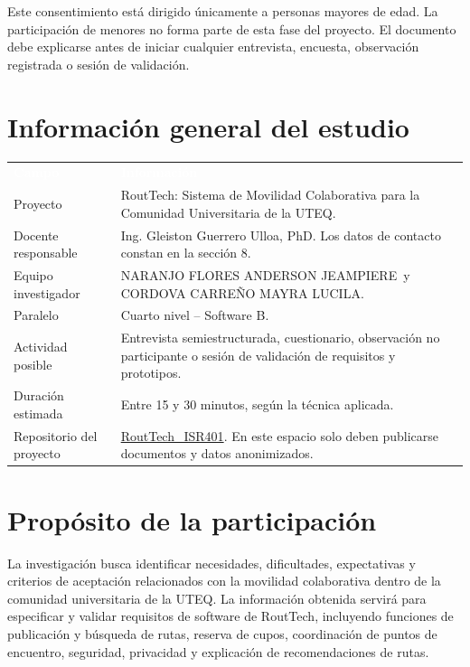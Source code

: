 \documentclass[10pt,a4paper]{article}
\newcommand{\Proyecto}{RoutTech: Sistema de Movilidad Colaborativa para la Comunidad Universitaria de la UTEQ}
\newcommand{\Repositorio}{https://github.com/AnderJM3/RoutTech_ISR401}
\newcommand{\Paralelo}{Cuarto nivel -- Software B}
\newcommand{\Docente}{Ing. Gleiston Guerrero Ulloa, PhD}
\newcommand{\Anderson}{NARANJO FLORES ANDERSON JEAMPIERE}
\newcommand{\Mayra}{CORDOVA CARREÑO MAYRA LUCILA}
\begin{document}
\begin{ConsentBox}
Este consentimiento está dirigido únicamente a personas mayores de edad. La participación de menores no forma parte de esta fase del proyecto. El documento debe explicarse antes de iniciar cualquier entrevista, encuesta, observación registrada o sesión de validación.
\end{ConsentBox}

\section{Información general del estudio}

\noindent\begin{tabularx}{\textwidth}{@{}L{4.45cm} Y@{}}
\textcolor{white}{\textbf{Campo}} & \textcolor{white}{\textbf{Información}}\\
Proyecto & \Proyecto.\\
Docente responsable & \Docente. Los datos de contacto constan en la sección 8.\\
Equipo investigador & \Anderson\ y \Mayra.\\
Paralelo & \Paralelo.\\
Actividad posible & Entrevista semiestructurada, cuestionario, observación no participante o sesión de validación de requisitos y prototipos.\\
Duración estimada & Entre 15 y 30 minutos, según la técnica aplicada.\\
Repositorio del proyecto & \href{\Repositorio}{RoutTech\_ISR401}. En este espacio solo deben publicarse documentos y datos anonimizados.\\
\end{tabularx}

\section{Propósito de la participación}

La investigación busca identificar necesidades, dificultades, expectativas y criterios de aceptación relacionados con la movilidad colaborativa dentro de la comunidad universitaria de la UTEQ. La información obtenida servirá para especificar y validar requisitos de software de RoutTech, incluyendo funciones de publicación y búsqueda de rutas, reserva de cupos, coordinación de puntos de encuentro, seguridad, privacidad y explicación de recomendaciones de rutas.
\end{document}
